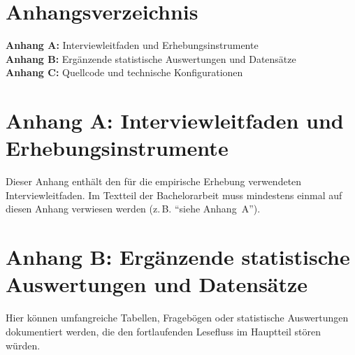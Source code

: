 
\section*{Anhangsverzeichnis}

\vspace{0.8cm}

\noindent
\textbf{Anhang A:} Interviewleitfaden und Erhebungsinstrumente\\[0.4cm]
\textbf{Anhang B:} Ergänzende statistische Auswertungen und Datensätze\\[0.4cm]
\textbf{Anhang C:} Quellcode und technische Konfigurationen

\newpage

\section*{Anhang A: Interviewleitfaden und Erhebungsinstrumente}
\label{anhang:A}

Dieser Anhang enthält den für die empirische Erhebung verwendeten Interviewleitfaden. Im Textteil der Bachelorarbeit muss mindestens einmal auf diesen Anhang verwiesen werden (z.\,B. \enquote{siehe Anhang~A}).

\lipsum[1-2]

\newpage

\section*{Anhang B: Ergänzende statistische Auswertungen und Datensätze}
\label{anhang:B}

Hier können umfangreiche Tabellen, Fragebögen oder statistische Auswertungen dokumentiert werden, die den fortlaufenden Lesefluss im Hauptteil stören würden.

\lipsum[3]
\lipsum[1-2]